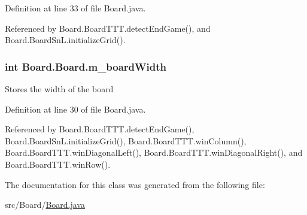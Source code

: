 Definition at line 33 of file Board.\+java.



Referenced by Board.\+Board\+T\+T\+T.\+detect\+End\+Game(), and Board.\+Board\+Sn\+L.\+initialize\+Grid().

\hypertarget{class_board_1_1_board_a811ddc59658729b3cdb0a2db75465334}{}
\subsubsection[{m\+\_\+board\+Width}]{\setlength{\rightskip}{0pt plus 5cm}int Board.\+Board.\+m\+\_\+board\+Width\hspace{0.3cm}{\ttfamily [protected]}}\label{class_board_1_1_board_a811ddc59658729b3cdb0a2db75465334}
Stores the width of the board 

Definition at line 30 of file Board.\+java.



Referenced by Board.\+Board\+T\+T\+T.\+detect\+End\+Game(), Board.\+Board\+Sn\+L.\+initialize\+Grid(), Board.\+Board\+T\+T\+T.\+win\+Column(), Board.\+Board\+T\+T\+T.\+win\+Diagonal\+Left(), Board.\+Board\+T\+T\+T.\+win\+Diagonal\+Right(), and Board.\+Board\+T\+T\+T.\+win\+Row().



The documentation for this class was generated from the following file\+:\begin{DoxyCompactItemize}
\item 
src/\+Board/\hyperlink{_board_8java}{Board.\+java}\end{DoxyCompactItemize}

